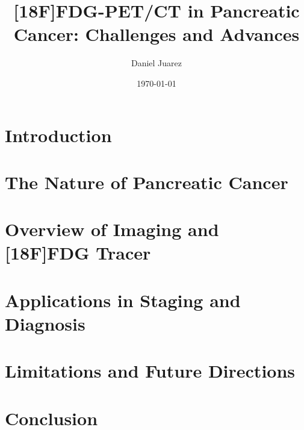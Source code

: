 \documentclass[11pt]{article}
\title{[18F]FDG-PET/CT in Pancreatic Cancer: Challenges and Advances}
\author{Daniel Juarez}
\date{\today}
\begin{document}
\maketitle

\begin{multicols}{2}
	
\section{Introduction}

    
\section{The Nature of Pancreatic Cancer}


\end{multicols}

\section{Overview of Imaging and [18F]FDG Tracer}


\section{Applications in Staging and Diagnosis}



\begin{multicols}{2}
	
\section{Limitations and Future Directions}



\section{Conclusion}


\end{multicols}


\end{document}
